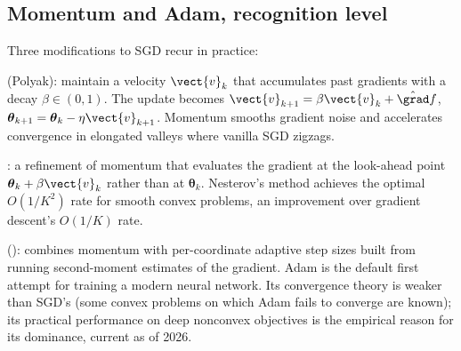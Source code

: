 \subsection{Momentum and Adam, recognition level}

Three modifications to SGD recur in practice:

 (Polyak): maintain a velocity $\vect{v}_{k}$
that accumulates past gradients with a decay $\beta \in (0, 1)$.
The update becomes $\vect{v}_{k+1} = \beta \vect{v}_{k} +
\hat{\grad} f$, $\boldsymbol{\theta}_{k+1} =
\boldsymbol{\theta}_{k} - \eta \vect{v}_{k+1}$. Momentum smooths
gradient noise and accelerates convergence in elongated valleys
where vanilla SGD zigzags.

: a refinement of momentum
that evaluates the gradient at the look-ahead point
$\boldsymbol{\theta}_{k} + \beta \vect{v}_{k}$ rather than at
$\boldsymbol{\theta}_{k}$. Nesterov's method achieves the optimal
$O(1/K^{2})$ rate for smooth convex problems, an improvement over
gradient descent's $O(1/K)$ rate.

 (\textcite{text:v2ch15-kingma-ba2015-adam}): combines
momentum with per-coordinate adaptive step sizes built from running
second-moment estimates of the gradient. Adam is the default first
attempt for training a modern neural network. Its convergence
theory is weaker than SGD's (some convex problems on which Adam
fails to converge are known); its practical performance on deep
nonconvex objectives is the empirical reason for its dominance,
current as of 2026.

